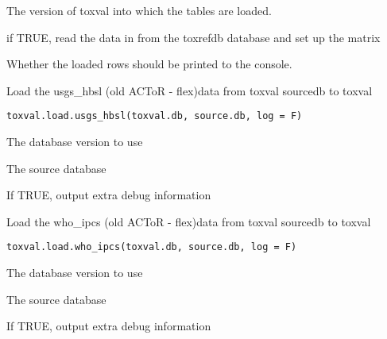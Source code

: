 \documentclass[letterpaper]{book}
\begin{document}
%
\begin{Arguments}
\begin{ldescription}
\item[\code{toxval.db}] The version of toxval into which the tables are loaded.

\item[\code{do.init}] if TRUE, read the data in from the toxrefdb database and set up the matrix

\item[\code{verbose}] Whether the loaded rows should be printed to the console.
\end{ldescription}
\end{Arguments}
%
\begin{Description}\relax
Load the usgs\_hbsl (old ACToR - flex)data  from toxval sourcedb to toxval
\end{Description}
%
\begin{Usage}
\begin{verbatim}
toxval.load.usgs_hbsl(toxval.db, source.db, log = F)
\end{verbatim}
\end{Usage}
%
\begin{Arguments}
\begin{ldescription}
\item[\code{toxval.db}] The database version to use

\item[\code{source.db}] The source database

\item[\code{verbose}] If TRUE, output extra debug information
\end{ldescription}
\end{Arguments}
%
\begin{Description}\relax
Load the who\_ipcs (old ACToR - flex)data  from toxval sourcedb to toxval
\end{Description}
%
\begin{Usage}
\begin{verbatim}
toxval.load.who_ipcs(toxval.db, source.db, log = F)
\end{verbatim}
\end{Usage}
%
\begin{Arguments}
\begin{ldescription}
\item[\code{toxval.db}] The database version to use

\item[\code{source.db}] The source database

\item[\code{verbose}] If TRUE, output extra debug information
\end{ldescription}
\end{Arguments}
\end{document}
